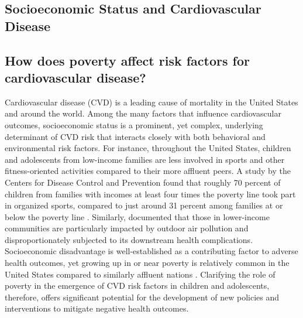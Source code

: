 \documentclass[12pt,leqno,titlepage]{amsart}
\newcommand{\1}{\mathbbm{1}}
\begin{document}
\begin{bibunit}

\maketitle
{}

\section{Socioeconomic Status and Cardiovascular Disease}

\subsection{How does poverty affect risk factors for cardiovascular disease?}

Cardiovascular disease (CVD) is a leading cause of mortality in the United States and around the world. Among the many factors that influence cardiovascular outcomes, socioeconomic status is a prominent, yet complex, underlying determinant of CVD risk that interacts closely with both behavioral and environmental risk factors. For instance, throughout the United States, children and adolescents from low-income families are less involved in sports and other fitness-oriented activities compared to their more affluent peers.  A study by the Centers for Disease Control and Prevention found that roughly 70 percent of children from families with incomes at least four times the poverty line took part in organized sports, compared to just around 31 percent among families at or below the poverty line \citep{black2022organized}. Similarly, 
\cite{rentschler2023global} documented that those in lower-income communities are particularly impacted by outdoor air pollution and disproportionately subjected to its downstream health complications. Socioeconomic disadvantage is well-established as a contributing factor to adverse health outcomes, yet growing up in or near poverty is relatively common in the United States compared to similarly affluent nations \citep{council2016poverty, shrider2023poverty}. Clarifying the role of poverty in the emergence of CVD risk factors in children and adolescents, therefore, offers significant potential for the development of new policies and interventions to mitigate negative health outcomes. 


\end{bibunit}
\end{document}
